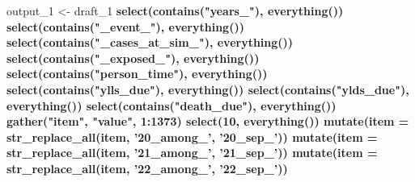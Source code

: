 \documentclass[]{article}
\newenvironment{Shaded}{\begin{snugshade}}{\end{snugshade}}
\newcommand{\DataTypeTok}[1]{\textcolor[rgb]{0.13,0.29,0.53}{#1}}
\newcommand{\DecValTok}[1]{\textcolor[rgb]{0.00,0.00,0.81}{#1}}
\newcommand{\KeywordTok}[1]{\textcolor[rgb]{0.13,0.29,0.53}{\textbf{#1}}}
\newcommand{\NormalTok}[1]{#1}
\newcommand{\OperatorTok}[1]{\textcolor[rgb]{0.81,0.36,0.00}{\textbf{#1}}}
\newcommand{\StringTok}[1]{\textcolor[rgb]{0.31,0.60,0.02}{#1}}
\begin{document}
\begin{Shaded}
\begin{Highlighting}[]
\NormalTok{output_}\DecValTok{1}\NormalTok{ <-}\StringTok{ }\NormalTok{draft_}\DecValTok{1} \OperatorTok{%>%}\StringTok{ }
\StringTok{  }\KeywordTok{select}\NormalTok{(}\KeywordTok{contains}\NormalTok{(}\StringTok{"years_"}\NormalTok{), }\KeywordTok{everything}\NormalTok{()) }\OperatorTok{%>%}\StringTok{ }
\StringTok{  }\KeywordTok{select}\NormalTok{(}\KeywordTok{contains}\NormalTok{(}\StringTok{"_event_"}\NormalTok{), }\KeywordTok{everything}\NormalTok{()) }\OperatorTok{%>%}\StringTok{ }
\StringTok{  }\KeywordTok{select}\NormalTok{(}\KeywordTok{contains}\NormalTok{(}\StringTok{"_cases_at_sim_"}\NormalTok{), }\KeywordTok{everything}\NormalTok{()) }\OperatorTok{%>%}\StringTok{ }
\StringTok{  }\KeywordTok{select}\NormalTok{(}\KeywordTok{contains}\NormalTok{(}\StringTok{"_exposed_"}\NormalTok{), }\KeywordTok{everything}\NormalTok{()) }\OperatorTok{%>%}\StringTok{ }
\StringTok{  }\KeywordTok{select}\NormalTok{(}\KeywordTok{contains}\NormalTok{(}\StringTok{"person_time"}\NormalTok{), }\KeywordTok{everything}\NormalTok{()) }\OperatorTok{%>%}\StringTok{ }
\StringTok{  }\KeywordTok{select}\NormalTok{(}\KeywordTok{contains}\NormalTok{(}\StringTok{"ylls_due"}\NormalTok{), }\KeywordTok{everything}\NormalTok{()) }\OperatorTok{%>%}\StringTok{ }
\StringTok{  }\KeywordTok{select}\NormalTok{(}\KeywordTok{contains}\NormalTok{(}\StringTok{"ylds_due"}\NormalTok{), }\KeywordTok{everything}\NormalTok{()) }\OperatorTok{%>%}\StringTok{ }
\StringTok{  }\KeywordTok{select}\NormalTok{(}\KeywordTok{contains}\NormalTok{(}\StringTok{"death_due"}\NormalTok{), }\KeywordTok{everything}\NormalTok{()) }\OperatorTok{%>%}\StringTok{ }
\StringTok{  }\KeywordTok{gather}\NormalTok{(}\StringTok{"item"}\NormalTok{, }\StringTok{"value"}\NormalTok{, }\DecValTok{1}\OperatorTok{:}\DecValTok{1373}\NormalTok{) }\OperatorTok{%>%}\StringTok{ }
\StringTok{  }\KeywordTok{select}\NormalTok{(}\DecValTok{10}\NormalTok{, }\KeywordTok{everything}\NormalTok{()) }\OperatorTok{%>%}\StringTok{ }
\StringTok{  }\KeywordTok{mutate}\NormalTok{(}\DataTypeTok{item =} \KeywordTok{str_replace_all}\NormalTok{(item, }\StringTok{'20_among_'}\NormalTok{, }\StringTok{'20_sep_'}\NormalTok{)) }\OperatorTok{%>%}\StringTok{ }
\StringTok{  }\KeywordTok{mutate}\NormalTok{(}\DataTypeTok{item =} \KeywordTok{str_replace_all}\NormalTok{(item, }\StringTok{'21_among_'}\NormalTok{, }\StringTok{'21_sep_'}\NormalTok{)) }\OperatorTok{%>%}\StringTok{ }
\StringTok{  }\KeywordTok{mutate}\NormalTok{(}\DataTypeTok{item =} \KeywordTok{str_replace_all}\NormalTok{(item, }\StringTok{'22_among_'}\NormalTok{, }\StringTok{'22_sep_'}\NormalTok{)) }\OperatorTok{%>%}\StringTok{ }
}}}}}}}}}}}}}}
\end{Highlighting}
\end{Shaded}
\end{document}
